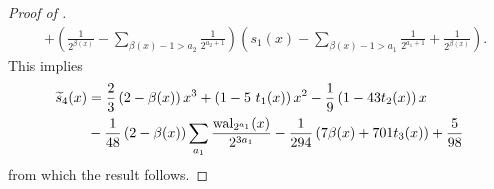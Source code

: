 \documentclass[acmsmall]{acmart}
\begin{document}
\begin{proof}[Proof of ]
\begin{align*}
        &+ \left(\frac{1}{2^{\beta(x)}} - \sum_{\beta(x)-1 > a_2} \frac{1}{2^{a_2+1}}\right)\left(s_1(x) - \sum_{\beta(x)-1 > a_1} \frac{1}{2^{a_1+1}} + \frac{1}{2^{\beta(x)}}\right).
    \end{align*}
    This implies 
    \begin{align*}
        {\widetilde{s}}_4(x) &=  \frac{2}{3}\left(2-\beta(x)\right)x^3 + \left(1-5\ t_1(x)\right)x^2 - \frac{1}{9} \left(1 - 43 t_2(x)\right)x \\
        &-\frac{1}{48} \left(2-\beta(x)\right)\sum_{a_1} \frac{\mathrm{wal}_{2^{a_1}}(x)}{2^{3a_1}} -\frac{1}{294} \left(7\beta(x)+701 t_3(x)\right) +\frac{5}{98}
    \end{align*}
    from which the result follows.
\end{proof}


\end{document}
